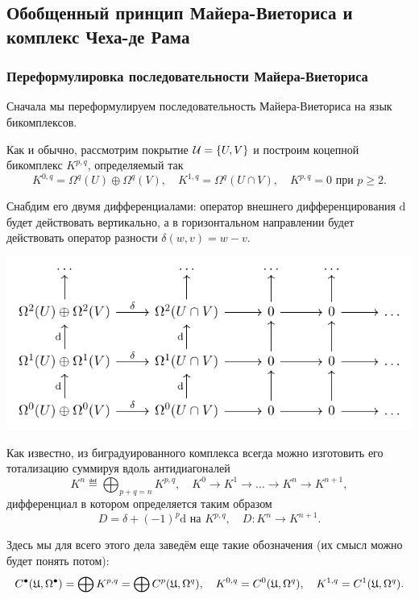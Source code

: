 
	\subsection{Обобщенный принцип Майера-Виеториса и комплекс Чеха-де Рама}

	\subsubsection{Переформулировка последовательности Майера-Виеториса}

	Сначала мы переформулируем последовательность Майера-Виеториса на язык бикомплексов. 

	Как и обычно, рассмотрим покрытие $\mathcal{U} = \{ U, V \}$ и построим коцепной бикомплекс $K^{p, q}$, определяемый так
	\[
		K^{0, q} = \Omega^{q}(U) \oplus \Omega^{q}(V), \quad K^{1, q} = \Omega^{q}(U \cap V), \quad K^{p, q} = 0 \text{ при } p \ge 2.
	\]

	Снабдим его двумя дифференциалами: оператор внешнего дифференцирования $\mathrm{d}$ будет действовать вертикально, а в горизонтальном направлении будет действовать оператор разности $\delta(w, v) = w - v$. 

	\begin{center}
		\includegraphics{lectures/7/pictures/cd_30.pdf}
	\end{center}

	Как известно, из биградуированного комплекса всегда можно изготовить его тотализацию суммируя вдоль антидиагоналей
	\[
		K^n \eqdef \bigoplus_{p + q = n} K^{p, q}, \quad K^0 \to K^1 \to \ldots \to K^n \to K^{n + 1},
	\]
	 дифференциал в котором определяется таким образом
	 \[
	 	D = \delta + (-1)^p\mathrm{d} \text{ на } K^{p, q}, \quad D\colon K^n \to K^{n + 1}. 
	 \]

	 Здесь мы для всего этого дела заведём еще такие обозначения (их смысл можно будет понять потом): 
	 \[
	 	C^{\bullet}(\mathfrak{U}, \Omega^{\bullet}) = \bigoplus K^{p, q} = \bigoplus C^{p}(\mathfrak{U}, \Omega^{q}), \quad K^{0, q} = C^{0}(\mathfrak{U}, \Omega^{q}), \quad K^{1, q} = C^{1}(\mathfrak{U}, \Omega^q).
	 \]
	
